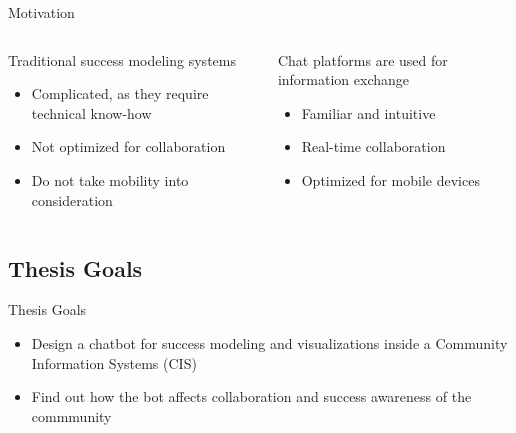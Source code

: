 \begin{frame}{Motivation}
  \begin{columns}
    \begin{column}[]{0.5\textwidth}

      Traditional success modeling systems
      \begin{itemize}
        \item Complicated, as they require technical know-how
        \item Not optimized for collaboration
        \item Do not take mobility into consideration
      \end{itemize}

    \end{column}
    \begin{column}[]{0.5\textwidth}
      Chat platforms are used for information exchange
      \begin{itemize}
        \item Familiar and intuitive
        \item Real-time collaboration
        \item Optimized for mobile devices
      \end{itemize}
    \end{column}
  \end{columns}

\end{frame}


\subsection{Thesis Goals}

\begin{frame}{Thesis Goals}
  \begin{itemize}
    \item Design a chatbot for success modeling and visualizations
          inside a Community Information Systems (CIS)
    \item Find out how the bot affects collaboration and success awareness of the commmunity %
  \end{itemize}
\end{frame}



